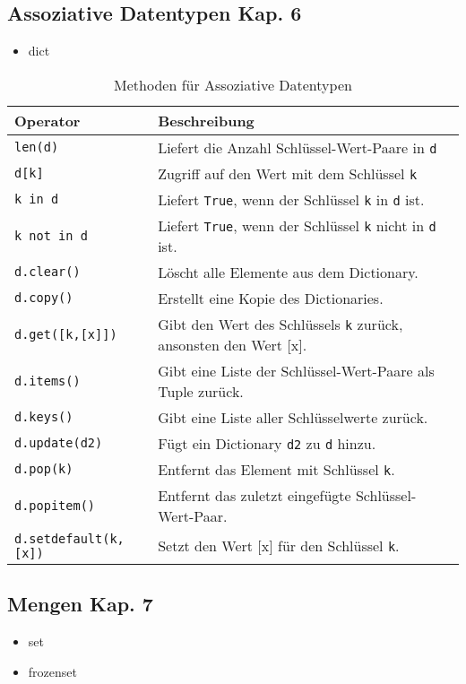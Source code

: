 \subsection[Assoziative Datentypen]{Assoziative Datentypen \tiny{Kap. 6}}
\begin{itemize}
	\item dict
\end{itemize}
\begin{table}[H]
\begin{threeparttable}
\caption{Methoden für Assoziative Datentypen}
\begin{tabular}{|l|l|}
	\hline 
	\textbf{Operator} &\textbf{Beschreibung}\\ 
	\hline 
	\texttt{len(d)} &Liefert die Anzahl Schlüssel-Wert-Paare in \texttt{d}\\
	\texttt{d[k]} &Zugriff auf den Wert mit dem Schlüssel \texttt{k}\\
	\texttt{k in d} &Liefert \texttt{True}, wenn der Schlüssel \texttt{k} in \texttt{d} ist.\\
	\texttt{k not in d} &Liefert \texttt{True}, wenn der Schlüssel \texttt{k} nicht in \texttt{d} ist.\\
	\texttt{d.clear()} &Löscht alle Elemente aus dem Dictionary.\\
	\texttt{d.copy()} &Erstellt eine Kopie des Dictionaries.\\
	\texttt{d.get([k,[x]])} &Gibt den Wert des Schlüssels \texttt{k} zurück, ansonsten den Wert [x].\\
	\texttt{d.items()} &Gibt eine Liste der Schlüssel-Wert-Paare als Tuple zurück.\\
	\texttt{d.keys()} &Gibt eine Liste aller Schlüsselwerte zurück.\\
	\texttt{d.update(d2)} &Fügt ein Dictionary \texttt{d2} zu \texttt{d} hinzu.\\
	\texttt{d.pop(k)} &Entfernt das Element mit Schlüssel \texttt{k}.\\
	\texttt{d.popitem()} &Entfernt das zuletzt eingefügte Schlüssel-Wert-Paar.\\
	\texttt{d.setdefault(k,[x])} &Setzt den Wert [x] für den Schlüssel \texttt{k}.\\
	\hline 
\end{tabular}
\end{threeparttable}
\end{table}

\pagebreak
\subsection[Mengen]{Mengen \tiny{Kap. 7}}
\begin{itemize}
	\item set
	\item frozenset
\end{itemize}

